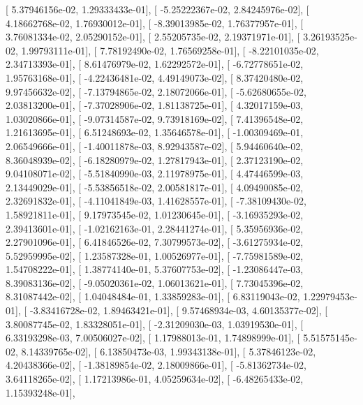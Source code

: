\documentclass{article}
\begin{document}
       [  5.37946156e-02,   1.29333433e-01],
       [ -5.25222367e-02,   2.84245976e-02],
       [  4.18662768e-02,   1.76930012e-01],
       [ -8.39013985e-02,   1.76377957e-01],
       [  3.76081334e-02,   2.05290152e-01],
       [  2.55205735e-02,   2.19371971e-01],
       [  3.26193525e-02,   1.99793111e-01],
       [  7.78192490e-02,   1.76569258e-01],
       [ -8.22101035e-02,   2.34713393e-01],
       [  8.61476979e-02,   1.62292572e-01],
       [ -6.72778651e-02,   1.95763168e-01],
       [ -4.22436481e-02,   4.49149073e-02],
       [  8.37420480e-02,   9.97456632e-02],
       [ -7.13794865e-02,   2.18072066e-01],
       [ -5.62680655e-02,   2.03813200e-01],
       [ -7.37028906e-02,   1.81138725e-01],
       [  4.32017159e-03,   1.03020866e-01],
       [ -9.07314587e-02,   9.73918169e-02],
       [  7.41396548e-02,   1.21613695e-01],
       [  6.51248693e-02,   1.35646578e-01],
       [ -1.00309469e-01,   2.06549666e-01],
       [ -1.40011878e-03,   8.92943587e-02],
       [  5.94460640e-02,   8.36048939e-02],
       [ -6.18280979e-02,   1.27817943e-01],
       [  2.37123190e-02,   9.04108071e-02],
       [ -5.51840990e-03,   2.11978975e-01],
       [  4.47446599e-03,   2.13449029e-01],
       [ -5.53856518e-02,   2.00581817e-01],
       [  4.09490085e-02,   2.32691832e-01],
       [ -4.11041849e-03,   1.41628557e-01],
       [ -7.38109430e-02,   1.58921811e-01],
       [  9.17973545e-02,   1.01230645e-01],
       [ -3.16935293e-02,   2.39413601e-01],
       [ -1.02162163e-01,   2.28441274e-01],
       [  5.35956936e-02,   2.27901096e-01],
       [  6.41846526e-02,   7.30799573e-02],
       [ -3.61275934e-02,   5.52959995e-02],
       [  1.23587328e-01,   1.00526977e-01],
       [ -7.75981589e-02,   1.54708222e-01],
       [  1.38774140e-01,   5.37607753e-02],
       [ -1.23086447e-03,   8.39083136e-02],
       [ -9.05020361e-02,   1.06013621e-01],
       [  7.73045396e-02,   8.31087442e-02],
       [  1.04048484e-01,   1.33859283e-01],
       [  6.83119043e-02,   1.22979453e-01],
       [ -3.83416728e-02,   1.89463421e-01],
       [  9.57468934e-03,   4.60135377e-02],
       [  3.80087745e-02,   1.83328051e-01],
       [ -2.31209030e-03,   1.03919530e-01],
       [  6.33193298e-03,   7.00506027e-02],
       [  1.17988013e-01,   1.74898999e-01],
       [  5.51575145e-02,   8.14339765e-02],
       [  6.13850473e-03,   1.99343138e-01],
       [  5.37846123e-02,   4.20438366e-02],
       [ -1.38189854e-02,   2.18009866e-01],
       [ -5.81362734e-02,   3.64118265e-02],
       [  1.17213986e-01,   4.05259634e-02],
       [ -6.48265433e-02,   1.15393248e-01],
\end{document}
